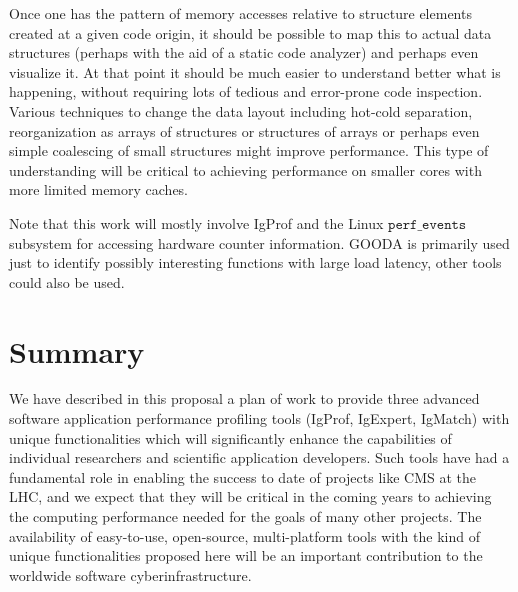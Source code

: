 \documentclass[notitlepage,letter,12pt]{article}
\begin{document}
Once one has the pattern of memory accesses relative to structure
elements created at a given code origin, it should be possible to
map this to actual data structures (perhaps with the aid of a static
code analyzer) and perhaps even visualize it. At that point it
should be much easier to understand better what is happening, without
requiring lots of tedious and error-prone code inspection. Various
techniques to change the data layout including hot-cold separation,
reorganization as arrays of structures or structures of arrays or
perhaps even simple coalescing of small structures might improve
performance. This type of understanding will be critical to achieving
performance on smaller cores with more limited memory caches.

Note that this work will mostly involve IgProf and the Linux 
$\texttt{perf\_events}$ subsystem for accessing hardware counter 
information. GOODA is primarily used just to identify possibly 
interesting functions with large load latency, other tools could also be 
used.



\section{Summary}

We have described in this proposal a plan of work to provide three
advanced software application performance profiling tools (IgProf,
IgExpert, IgMatch) with unique functionalities which will significantly 
enhance the capabilities of individual researchers and scientific 
application developers. Such tools have had a fundamental role in enabling
the success to date of projects like CMS at the LHC, and we expect
that they will 
be critical in the coming years to achieving the computing performance 
needed for the goals of many other projects.
The availability of easy-to-use, open-source, multi-platform 
tools with the kind of unique functionalities proposed here will be
an important contribution to the worldwide software cyberinfrastructure.


\newpage

\end{document}
